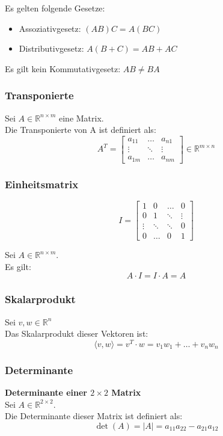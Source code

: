 \documentclass[10pt,a4paper]{article}
\begin{document}
Es gelten folgende Gesetze:
\begin{itemize}
	\item Assoziativgesetz: $(AB)C = A(BC)$
	\item Distributivgesetz: $A(B + C) = AB + AC$
\end{itemize}

Es gilt kein Kommutativgesetz:
$AB ≠ BA$

\subsubsection{Transponierte}
Sei $A \in \mathbb{R}^{n \times m}$ eine Matrix. \\
Die Transponierte von A ist definiert als:
$$
	A^T =  \begin{bmatrix}
	a_{11} & \dots & a_{n1} \\
	\vdots & \ddots & \vdots \\
	a_{1m} & \dots & a_{nm}
	\end{bmatrix} \in \mathbb{R}^{m \times n}
$$

\subsubsection{Einheitsmatrix}
$$
I = \begin{bmatrix}
1 & 0 & \dots & 0 \\
0 & 1 & \ddots & \vdots \\
\vdots & \ddots & \ddots & 0 \\
0 & \dots & 0 & 1
\end{bmatrix}
$$

Sei $A \in \mathbb{R}^{n \times m}$. \\
Es gilt:
$$
A ⋅ I = I ⋅ A = A
$$

\subsubsection{Skalarprodukt}
Sei $v, w \in \mathbb{R}^n$ \\
Das Skalarprodukt dieser Vektoren ist:
$$
\langle v, w \rangle = v^T ⋅ w = v_1w_1 + \dots + v_nw_n
$$

\subsubsection{Determinante}
\textbf{Determinante einer $2 \times 2$ Matrix} \\
Sei $A \in \mathbb{R}^{2 \times 2}$. \\
Die Determinante dieser Matrix ist definiert als:
$$
	\det(A) = |A| = a_{11}a_{22} - a_{21}a_{12}
$$
\end{document}
